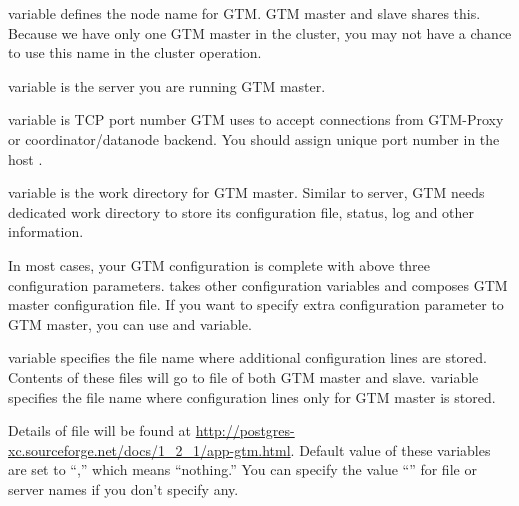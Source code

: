        variable defines the node name for GTM.
      GTM master and slave shares this.
      Because we have only one GTM master in the cluster, you may not have a chance to use
	  this name in the cluster operation.
  
  
       variable is the server you are running GTM master.
  
  
       variable is TCP port number GTM uses to accept connections from
	  GTM-Proxy or coordinator/datanode backend.
      You should assign unique port number in the host .
  
  
       variable is the work directory for GTM master.
      Similar to \PG{} server, GTM needs dedicated work directory to store its configuration file,
	  status, log and other information.
  
  \vspace{-3pt}
  
      In most cases, your GTM configuration is complete with above three configuration parameters.
       takes other configuration variables and composes GTM master configuration file.
      If you want to specify extra configuration parameter to GTM master, you can use
	   and  variable.
      
       variable specifies the file name where additional 
	  configuration lines are stored.
      Contents of these files will go to  file of both GTM master and slave.
       variable specifies the file name where 
	  configuration lines only for GTM master is stored.
      
      Details of  file will be found at
	  \url{http://postgres-xc.sourceforge.net/docs/1_2_1/app-gtm.html}.
      Default value of these variables are set to ``,''  which means ``nothing.''
      You can specify the value ``'' for file or server names if you don't specify any.
      
